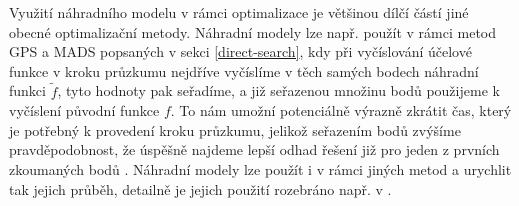 Využití náhradního modelu v rámci optimalizace je většinou dílčí částí jiné obecné optimalizační metody. Náhradní modely lze např. použít v rámci metod GPS a MADS popsaných v sekci \ref{direct-search}, kdy při vyčíslování účelové funkce v kroku průzkumu nejdříve vyčíslíme v těch samých bodech náhradní funkci $ \tilde{f} $, tyto hodnoty pak seřadíme, a již seřazenou množinu bodů použijeme k vyčíslení původní funkce $ f $. To nám umožní potenciálně výrazně zkrátit čas, který je potřebný k provedení kroku průzkumu, jelikož seřazením bodů zvýšíme pravděpodobnost, že úspěšně najdeme lepší odhad řešení již pro jeden z prvních zkoumaných bodů \cite{BBO-textbook}. Náhradní modely lze použít i v rámci jiných metod a urychlit tak jejich průběh, detailně je jejich použití rozebráno např. v \cite{two-decades, BBO-textbook}.